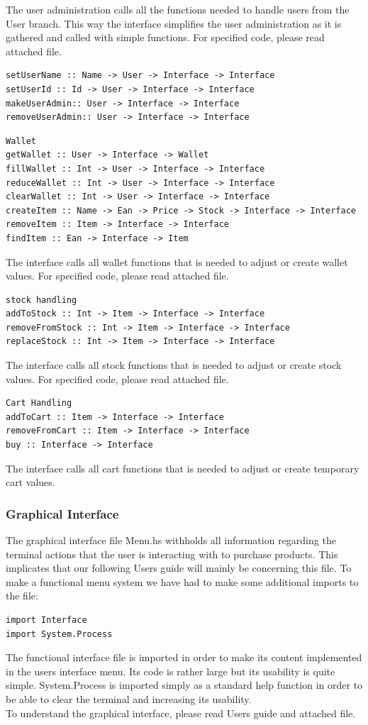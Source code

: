 \documentclass[11pt]{article}
\begin{document}
The user administration calls all the functions needed to handle users from the User branch. This way the interface simplifies the user administration as it is gathered and called with simple functions. For specified code, please read attached file.
\begin{lstlisting}
setUserName :: Name -> User -> Interface -> Interface
setUserId :: Id -> User -> Interface -> Interface
makeUserAdmin:: User -> Interface -> Interface
removeUserAdmin:: User -> Interface -> Interface
\end{lstlisting}
\begin{lstlisting}
Wallet
getWallet :: User -> Interface -> Wallet
fillWallet :: Int -> User -> Interface -> Interface
reduceWallet :: Int -> User -> Interface -> Interface
clearWallet :: Int -> User -> Interface -> Interface
createItem :: Name -> Ean -> Price -> Stock -> Interface -> Interface
removeItem :: Item -> Interface -> Interface
findItem :: Ean -> Interface -> Item
\end{lstlisting}
The interface calls all wallet functions that is needed to adjust or create wallet values. For specified code, please read attached file.
\begin{lstlisting}
stock handling
addToStock :: Int -> Item -> Interface -> Interface
removeFromStock :: Int -> Item -> Interface -> Interface
replaceStock :: Int -> Item -> Interface -> Interface
\end{lstlisting}
The interface calls all stock functions that is needed to adjust or create stock values. For specified code, please read attached file.
\begin{lstlisting}
Cart Handling
addToCart :: Item -> Interface -> Interface
removeFromCart :: Item -> Interface -> Interface
buy :: Interface -> Interface
\end{lstlisting}
The interface calls all cart functions that is needed to adjust or create temporary cart values.
\subsubsection{Graphical Interface}
The graphical interface file Menu.hs withholds all information regarding the terminal actions that the user is interacting with to purchase products. This implicates that our following Users guide will mainly be concerning this file. To make a functional menu system we have had to make some additional imports to the file:
\begin{lstlisting}
import Interface
import System.Process
\end{lstlisting}
The functional interface file is imported in order to make its content implemented in the users interface menu. Its code is rather large but its usability is quite simple. System.Process is imported simply as a standard help function in order to be able to clear the terminal and increasing its usability.
\\
To understand the graphical interface, please read Users guide and attached file.
\pagebreak
\end{document}
